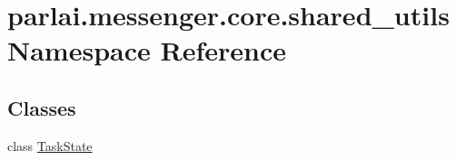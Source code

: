 \hypertarget{namespaceparlai_1_1messenger_1_1core_1_1shared__utils}{}\section{parlai.\+messenger.\+core.\+shared\+\_\+utils Namespace Reference}
\label{namespaceparlai_1_1messenger_1_1core_1_1shared__utils}
\subsection*{Classes}
\begin{DoxyCompactItemize}
\item 
class \hyperlink{classparlai_1_1messenger_1_1core_1_1shared__utils_1_1TaskState}{Task\+State}
\end{DoxyCompactItemize}
